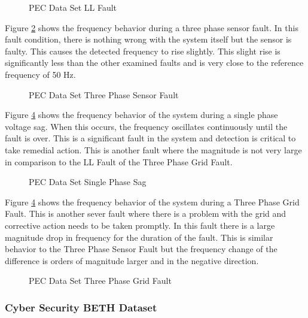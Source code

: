 \begin{figure}[H]
    \centering
    
    \caption{PEC Data Set LL Fault}
    \label{fig:pec_ll_fault}
\end{figure}

Figure \ref{fig:pec_three_phase_sensor} shows the frequency behavior during a three phase sensor fault. In this fault condition, there is nothing wrong with the system itself but the sensor is faulty. This causes the detected frequency to rise slightly. This slight rise is significantly less than the other examined faults and is very close to the reference frequency of 50 Hz. 

\begin{figure}[H]
    \centering
    
    \caption{PEC Data Set Three Phase Sensor Fault}
    \label{fig:pec_three_phase_sensor}
\end{figure}

Figure \ref{fig:pec_three_phase_grid_fault} shows the frequency behavior of the system during a single phase voltage sag. When this occurs, the frequency oscillates continuously until the fault is over. This is a significant fault in the system and detection is critical to take remedial action. This is another fault where the magnitude is not very large in comparison to the LL Fault of the Three Phase Grid Fault.

\begin{figure}[H]
    \centering
    
    \caption{PEC Data Set Single Phase Sag}
    \label{fig:pec_single_phase_sag}
\end{figure}

Figure \ref{fig:pec_three_phase_grid_fault} shows the frequency behavior of the system during a Three Phase Grid Fault. This is another sever fault where there is a problem with the grid and corrective action needs to be taken promptly. In this fault there is a large magnitude drop in frequency for the duration of the fault. This is similar behavior to the Three Phase Sensor Fault but the frequency change of the difference is orders of magnitude larger and in the negative direction.

\begin{figure}[H]
    \centering
    
    \caption{PEC Data Set Three Phase Grid Fault}
    \label{fig:pec_three_phase_grid_fault}
\end{figure}


\subsubsection{Cyber Security BETH Dataset}
\label{ref_beth_dataset}

